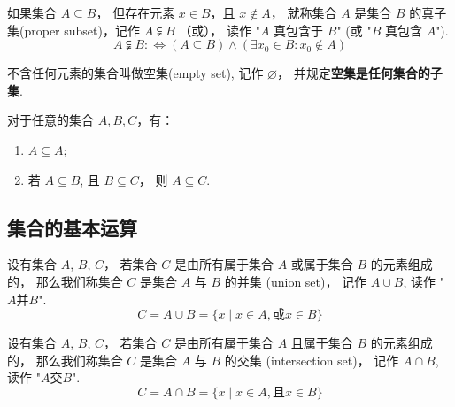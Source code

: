 \documentclass[../main.tex]{subfiles}
\begin{document}
\begin{definition}[真子集]\label{def:proper-subset}
   如果集合 $A \subseteq B$， 但存在元素 $x \in B$，且 $x \notin A$， 就称集合 $A$ 是集合 $B$ 的\textcolor{main}{真子集}(proper subset)，记作 $A \subsetneqq B$ （或）， 读作 "$A$ 真包含于 $B$" (或 "$B$ 真包含 $A$").
   \begin{equation*}
       A \subsetneqq B :\Leftrightarrow (A \subseteq B) \land (\exists x_0 \in B: x_0 \notin A)
   \end{equation*}
\end{definition}

\begin{definition}[空集]\label{def:empty-set}
    不含任何元素的集合叫做\textcolor{main}{空集}(empty set), 记作 $\varnothing$， 并规定\textbf{空集是任何集合的子集}.
\end{definition}

\begin{property}\label{property:set-relation-prop}
    对于任意的集合 $A, B, C$，有：
    \begin{enumerate}
        \item $A \subseteq A$;
        \item 若 $A \subseteq B$, 且 $B \subseteq C$， 则 $A \subseteq C$.
    \end{enumerate}
\end{property}




\subsection{集合的基本运算}

\begin{definition}[并集]\label{def:union-set}
    设有集合 $A$, $B$, $C$， 若集合 $C$ 是由所有属于集合 $A$ \textcolor{second}{或}属于集合 $B$ 的元素组成的， 那么我们称集合 $C$ 是集合 $A$ 与 $B$ 的\textcolor{main}{并集} (union set)， 记作 $A \cup B$, 读作 "$A \mbox{并} B$". 
    \begin{equation*}
        C = A \cup B = \{ x \mid x \in A, \mbox{或} x \in B \}
    \end{equation*}
\end{definition}

\begin{definition}[交集]\label{def:intersection-set}
    设有集合 $A$, $B$, $C$， 若集合 $C$ 是由所有属于集合 $A$ \textcolor{second}{且}属于集合 $B$ 的元素组成的， 那么我们称集合 $C$ 是集合 $A$ 与 $B$ 的\textcolor{main}{交集} (intersection set)， 记作 $A \cap B$, 读作 "$A \mbox{交} B$". 
    \begin{equation*}
        C = A \cap B = \{ x \mid x \in A, \mbox{且} x \in B \}
    \end{equation*}
\end{definition}
\end{document}
